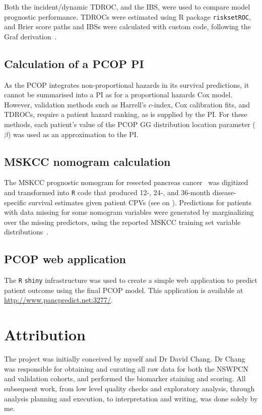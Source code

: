 \documentclass[dissertation.tex]{subfiles}
\begin{document}
Both the incident/dynamic \gls{TDROC}, and the \gls{IBS}, were used to compare model prognostic performance.  \glspl{TDROC} were estimated using R package \texttt{risksetROC}, and Brier score paths and \glspl{IBS} were calculated with custom code, following the Graf derivation~\cite{Graf1999}.

\subsection{Calculation of a \texorpdfstring{\acrshort{PCOP}}{PCOP} \texorpdfstring{\acrlong{PI}}{prognostic index}}
As the \gls{PCOP} integrates non-proportional hazards in its survival predictions, it cannot be summarised into a \gls{PI} as for a proportional hazards Cox model.  However, validation methods such as Harrell's $c$-index, Cox calibration fits, and \glspl{TDROC}, require a patient hazard ranking, as is supplied by the \gls{PI}.  For these methods, each patient's value of the \gls{PCOP} \gls{GG} distribution location parameter ($\beta$) was used as an approximation to the \gls{PI}.

\subsection{\texorpdfstring{\acrshort{MSKCC}}{MSKCC} nomogram calculation}
The \gls{MSKCC} prognostic nomogram for resected pancreas cancer~\cite{Brennan2004} was digitized and transformed into \texttt{R} code that produced 12-, 24-, and 36-month disease-specific survival estimates given patient \glspl{CPV} (see  on ).  Predictions for patients with data missing for some nomogram variables were generated by marginalizing over the missing predictors, using the reported \gls{MSKCC} training set variable distributions~\cite{Brennan2004}.

\subsection{\texorpdfstring{\acrshort{PCOP}}{PCOP} web application}
The \texttt{R} \texttt{shiny} infrastructure was used to create a simple web application to predict patient outcome using the final \gls{PCOP} model.  This application is available at \url{http://www.pancpredict.net:3277/}.

\section{Attribution}
The project was initially conceived by myself and Dr David Chang.  Dr Chang was responsible for obtaining and curating all raw data for both the \gls{NSWPCN} and validation cohorts, and performed the biomarker staining and scoring.  All subsequent work, from low level quality checks and exploratory analysis, through analysis planning and execution, to interpretation and writing, was done solely by me.
\end{document}
